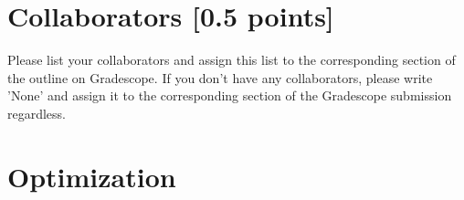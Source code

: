 \documentclass[11pt,english]{article}
\begin{document}

\section{Collaborators [0.5 points]}

Please list your collaborators and assign this list to the corresponding section of the outline on Gradescope. If you don't have any collaborators, please write 'None' and assign it to the corresponding section of the Gradescope submission regardless.


\section{Optimization}
\end{document}
